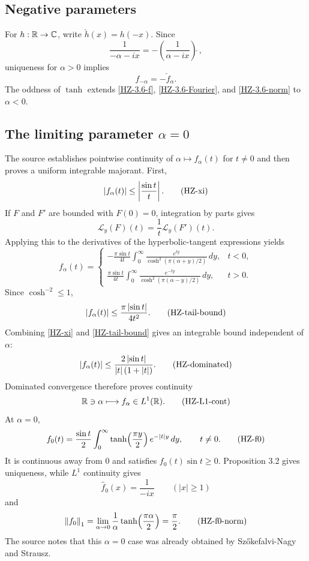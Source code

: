 \subsection{Negative parameters}

For $h:\mathbb{R}\to\mathbb{C}$, write $\check h(x)=h(-x)$. Since
\[
  \frac1{-\alpha-ix}
  =-\left(\frac1{\alpha-ix}\right)\!\check{\ },
  \tag{HZ-reflect-multiplier}\label{HZ-reflect-multiplier}
\]
uniqueness for $\alpha>0$ implies
\[
  f_{-\alpha}=-\check f_\alpha.
  \tag{HZ-reflect-density}\label{HZ-reflect-density}
\]
The oddness of $\tanh$ extends \eqref{HZ-3.6-f}, \eqref{HZ-3.6-Fourier}, and \eqref{HZ-3.6-norm} to $\alpha<0$.

\subsection{The limiting parameter \texorpdfstring{$\alpha=0$}{alpha equals 0}}

The source establishes pointwise continuity of $\alpha\mapsto f_\alpha(t)$ for $t\ne0$ and then proves a uniform integrable majorant. First,
\[
  \left\lvert f_\alpha(t)\right\rvert\le\left\lvert \frac{\sin t}{t}\right\rvert.
  \tag{HZ-xi}\label{HZ-xi}
\]
If $F$ and $F'$ are bounded with $F(0)=0$, integration by parts gives
\[
  \mathcal L_y(F)(t)=\frac1t\mathcal L_y(F')(t).
  \tag{HZ-Laplace-parts}\label{HZ-Laplace-parts}
\]
Applying this to the derivatives of the hyperbolic-tangent expressions yields
\[
 f_\alpha(t)=
 \begin{cases}
 \displaystyle
 -\frac{\pi\sin t}{4t}
  \int_0^\infty
  \frac{e^{ty}}{\cosh^2(\pi(\alpha+y)/2)}\,dy,
 &t<0,\\[2.2ex]
 \displaystyle
 \frac{\pi\sin t}{4t}
  \int_0^\infty
  \frac{e^{-ty}}{\cosh^2(\pi(\alpha-y)/2)}\,dy,
 &t>0.
 \end{cases}
 \tag{HZ-partial-integration-form}\label{HZ-partial-integration-form}
\]
Since $\cosh^{-2}\le1$,
\[
  \left\lvert f_\alpha(t)\right\rvert\le\frac{\pi\left\lvert \sin t\right\rvert}{4t^2}.
  \tag{HZ-tail-bound}\label{HZ-tail-bound}
\]
Combining \eqref{HZ-xi} and \eqref{HZ-tail-bound} gives an integrable bound independent of $\alpha$:
\[
  \left\lvert f_\alpha(t)\right\rvert
  \le \frac{2\left\lvert \sin t\right\rvert}{\left\lvert t\right\rvert(1+\left\lvert t\right\rvert)}.
  \tag{HZ-dominated}\label{HZ-dominated}
\]
Dominated convergence therefore proves continuity
\[
  \mathbb{R}\ni\alpha\longmapsto f_\alpha\in L^1(\mathbb{R}).
  \tag{HZ-L1-cont}\label{HZ-L1-cont}
\]
At $\alpha=0$,
\[
  f_0(t)
  =\frac{\sin t}{2}
     \int_0^\infty\tanh\!\left(\frac{\pi y}{2}\right)
       e^{-\left\lvert t\right\rvert y}\,dy,
  \qquad t\ne0.
  \tag{HZ-f0}\label{HZ-f0}
\]
It is continuous away from $0$ and satisfies $f_0(t)\sin t\ge0$. Proposition 3.2 gives uniqueness, while $L^1$ continuity gives
\[
  \widehat f_0(x)=\frac1{-ix}\qquad(|x|\ge1)
  \tag{HZ-f0-transform}\label{HZ-f0-transform}
\]
and
\[
  \left\lVert f_0\right\rVert_1
  =\lim_{\alpha\to0}
    \frac1\alpha\tanh\!\left(\frac{\pi\alpha}{2}\right)
  =\frac\pi2.
  \tag{HZ-f0-norm}\label{HZ-f0-norm}
\]
The source notes that this $\alpha=0$ case was already obtained by Sz\H{o}kefalvi-Nagy and Strausz.

